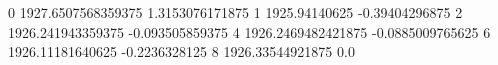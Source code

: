 0 1927.6507568359375 1.3153076171875
1 1925.94140625 -0.39404296875
2 1926.241943359375 -0.093505859375
4 1926.2469482421875 -0.0885009765625
6 1926.11181640625 -0.2236328125
8 1926.33544921875 0.0
